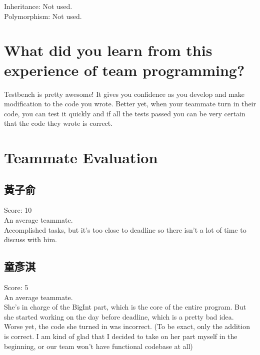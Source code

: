 \documentclass[12pt, A4]{article}
\begin{document}
    Inheritance: Not used.\\
    
    Polymorphism: Not used.
    
    \section{What did you learn from this experience of team programming?}
    
    Testbench is pretty awesome! It gives you confidence as you develop and make modification to the code you wrote. Better yet, when your teammate turn in their code, you can test it quickly and if all the tests passed you can be very certain that the code they wrote is correct.
    
    \section{Teammate Evaluation}
    
    \subsection{黃子俞}
    
    Score: 10\\
    
    An average teammate. \\
    
    Accomplished tasks, but it's too close to deadline so there isn't a lot of time to discuss with him. \\
    
    \subsection{童彥淇}
    
    Score: 5\\
    
    An average teammate. \\
    
    She's in charge of the BigInt part, which is the core of the entire program. But she started working on the day before deadline, which is a pretty bad idea.\\ 
    
    Worse yet, the code she turned in was incorrect. (To be exact, only the addition is correct. I am kind of glad that I decided to take on her part myself in the beginning, or our team won't have functional codebase at all)
    
\end{document}
